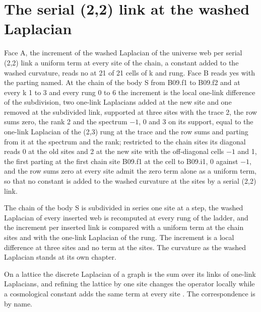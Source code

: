 \section{The serial (2,2) link at the washed Laplacian}\label{mod:X-6-D541010-w-stwl}
\begin{chwall}\label{box:X-6-D541010-w-stwl:1}
Face A, the increment of the washed Laplacian of the universe web per serial (2,2) link a uniform term at every site of the chain, a constant added to the washed curvature, reads no at 21 of 21 cells of k and rung. Face B reads yes with the parting named. At the chain of the body S from B09.f1 to B09.f2 and at every k 1 to 3 and every rung 0 to 6 the increment is the local one-link difference of the subdivision, two one-link Laplacians added at the new site and one removed at the subdivided link, supported at three sites with the trace 2, the row sums zero, the rank 2 and the spectrum $-1$, 0 and 3 on its support, equal to the one-link Laplacian of the (2,3) rung at the trace and the row sums and parting from it at the spectrum and the rank; restricted to the chain sites its diagonal reads 0 at the old sites and 2 at the new site with the off-diagonal cells $-1$ and 1, the first parting at the first chain site B09.f1 at the cell to B09.i1, 0 against $-1$, and the row sums zero at every site admit the zero term alone as a uniform term, so that no constant is added to the washed curvature at the sites by a serial (2,2) link.
\end{chwall}
The chain of the body S is subdivided in series one site at a step, the washed Laplacian of every inserted web is recomputed at every rung of the ladder, and the increment per inserted link is compared with a uniform term at the chain sites and with the one-link Laplacian of the rung. The increment is a local difference at three sites and no term at the sites. The curvature as the washed Laplacian stands at its own chapter.
\begin{chbridge}
On a lattice the discrete Laplacian of a graph is the sum over its links of one-link Laplacians, and refining the lattice by one site changes the operator locally while a cosmological constant adds the same term at every site \cite{Chung1997,Einstein1917}. The correspondence is by name.
\end{chbridge}
